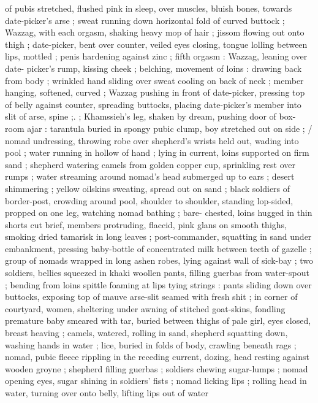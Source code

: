 of pubis stretched, flushed pink in sleep, over muscles, bluish bones, 
towards date-picker's arse ; sweat running down horizontal fold of 
curved buttock ; Wazzag, with each orgasm, shaking heavy mop of 
hair ; jissom flowing out onto thigh ; date-picker, bent over counter, 
veiled eyes closing, tongue lolling between lips, mottled ; penis 
hardening against zinc ; fifth orgasm : Wazzag, leaning over date- 
picker's rump, kissing cheek ; belching, movement of loins : drawing 
back from body ; wrinkled hand sliding over sweat cooling on back of 
neck ; member hanging, softened, curved ; Wazzag pushing in front 
of date-picker, pressing top of belly against counter, spreading 
buttocks, placing date-picker's member into slit of arse, spine ;. ; 
Khamssieh's leg, shaken by dream, pushing door of box-room ajar : 
tarantula buried in spongy pubic clump, boy stretched out on side{\td} ; 
{\slash} nomad undressing, throwing robe over shepherd's wrists held out, 
wading into pool ; water running in hollow of hand ; lying in current, 
loins supported on firm sand ; shepherd watering camels from 
golden copper cup, sprinkling rest over rumps ; water streaming 
around nomad's head submerged up to ears ; desert shimmering ; 
yellow oilskins sweating, spread out on sand ; black soldiers of 
border-post, crowding around pool, shoulder to shoulder, standing 
lop-sided, propped on one leg, watching nomad bathing ; bare- 
chested, loins hugged in thin shorts cut brief, members protruding, 
flaccid, pink glans on smooth thighs, smoking dried tamarisk in long 
leaves ; post-commander, squatting in sand under embankment, 
pressing baby-bottle of concentrated milk between teeth of gazelle 
; group of nomads wrapped in long ashen robes, lying against wall 
of sick-bay ; two soldiers, bellies squeezed in khaki woollen pants, 
filling guerbas from water-spout ; bending from loins spittle foaming 
at lips tying strings : pants sliding down over buttocks, exposing top 
of mauve arse-slit seamed with fresh shit ; in corner of courtyard, 
women, sheltering under awning of stitched goat-skins, fondling 
premature baby smeared with tar, buried between thighs of pale girl, 
eyes closed, breast heaving ; camels, watered, rolling in sand, 
shepherd squatting down, washing hands in water ; lice, buried in 
folds of body, crawling beneath rags ; nomad, pubic fleece rippling 
in the receding current, dozing, head resting against wooden groyne 
; shepherd filling guerbas ; soldiers chewing sugar-lumps ; nomad 
opening eyes, sugar shining in soldiers' fists ; nomad licking lips ; 
rolling head in water, turning over onto belly, lifting lips out of water{\td} 
